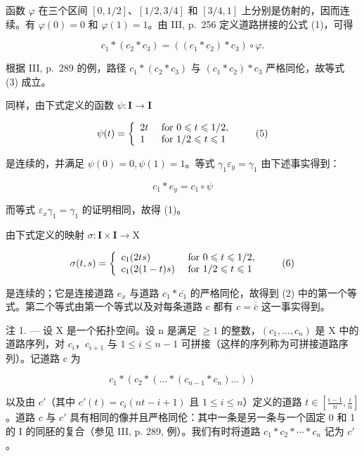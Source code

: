 函数 \(\varphi\) 在三个区间 \([0,1/2]\)、\([1/2,3/4]\) 和 \([3/4,1]\) 上分别是仿射的，因而连续。有 \(\varphi(0) = 0\) 和 \(\varphi(1) = 1\)。由 III, p.~256 定义道路拼接的公式 (1)，可得

\[
c _ {1} * (c _ {2} * c _ {3}) = ((c _ {1} * c _ {2}) * c _ {3}) \circ \varphi .
\]

根据 III, p.~289 的例，路径 \(c_{1} * (c_{2} * c_{3})\) 与 \((c_{1} * c_{2}) * c_{3}\) 严格同伦，故等式 (3) 成立。

同样，由下式定义的函数 \(\psi\colon\mathbf{I}\to\mathbf{I}\)

\[
\psi (t) = \left\{ \begin{array}{l l} 2 t & \text { for } 0 \leqslant t \leqslant 1 / 2, \\ 1 & \text { for } 1 / 2 \leqslant t \leqslant 1 \end{array} \right.\tag{5}
\]

是连续的，并满足 \(\psi(0)=0,\psi(1)=1\)。等式 \(\gamma_{1}\varepsilon_{y}=\gamma_{1}\) 由下述事实得到：

\[
c _ {1} * e _ {y} = c _ {1} \circ \psi
\]

而等式 \(\varepsilon_{x}\gamma_{1}=\gamma_{1}\) 的证明相同，故得 (1)。

由下式定义的映射 \(\sigma\colon\mathbf{I}\times\mathbf{I}\to\mathrm{X}\)

\[
\sigma (t, s) = \left\{ \begin{array}{l l} c _ {1} (2 t s) & \text { for } 0 \leqslant t \leqslant 1 / 2, \\ c _ {1} (2 (1 - t) s) & \text { for } 1 / 2 \leqslant t \leqslant 1 \end{array} \right.\tag{6}
\]

是连续的；它是连接道路 \(e_{x}\) 与道路 \(c_{1}*\overline{c_{1}}\) 的严格同伦，故得到 (2) 中的第一个等式。第二个等式由第一个等式以及对每条道路 c 都有 \(c=\overline{\overline{c}}\) 这一事实得到。

注 1. --- 设 X 是一个拓扑空间。设 n 是满足 \(\geqslant 1\) 的整数，\((c_{1},\ldots,c_{n})\) 是 X 中的道路序列，对 \(c_{i}\)，\(c_{i+1}\) 与 \(1 \leqslant i \leqslant n-1\) 可拼接（这样的序列称为可拼接道路序列）。记道路 c 为

\[
c _ {1} * \left(c _ {2} * \left(\dots * \left(c _ {n - 1} * c _ {n}\right) \ldots\right)\right)
\]

以及由 \(c'\)（其中 \(c'(t) = c_i(nt - i + 1)\) 且 \(1 \leqslant i \leqslant n\)）定义的道路 \(t \in [\frac{i-1}{n}, \frac{i}{n}]\)。道路 \(c\) 与 \(c'\) 具有相同的像并且严格同伦：其中一条是另一条与一个固定 0 和 1 的 I 的同胚的复合（参见 III, p. 289, 例）。我们有时将道路 \(c_{1} * c_{2} * \cdots * c_{n}\) 记为 \(c'\)。

